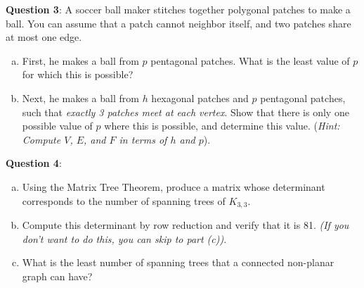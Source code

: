 \documentclass{amsart}
\begin{document}
	\newpage
	\noindent \textbf{Question 3}: A soccer ball maker stitches together polygonal patches to make a ball. You can assume that a patch cannot neighbor itself, and two patches share at most one edge.
	\begin{enumerate}[(a)]
		\item First, he makes a ball from $p$ pentagonal patches. What is the least value of $p$ for which this is possible? \vspace{250pt}
		\item Next, he makes a ball from $h$ hexagonal patches and $p$ pentagonal patches, such that \textit{exactly 3 patches meet at each vertex}. Show that there is only one possible value of $p$ where this is possible, and determine this value. (\textit{Hint: Compute $V$, $E$, and $F$ in terms of $h$ and $p$}).
	\end{enumerate}
	
	\newpage 
	
	\noindent \textbf{Question 4}: 
	
	\begin{enumerate}[(a)]
		\item Using the Matrix Tree Theorem, produce a matrix whose determinant corresponds to the number of spanning trees of $K_{3,3}$. \vspace{200pt}
		
		\item Compute this determinant by row reduction and verify that it is 81. \textit{(If you don't want to do this, you can skip to part (c))}.\vspace{200pt}
		
		
		\item What is the least number of spanning trees that a connected non-planar graph can have?
	\end{enumerate}
	
\end{document}
